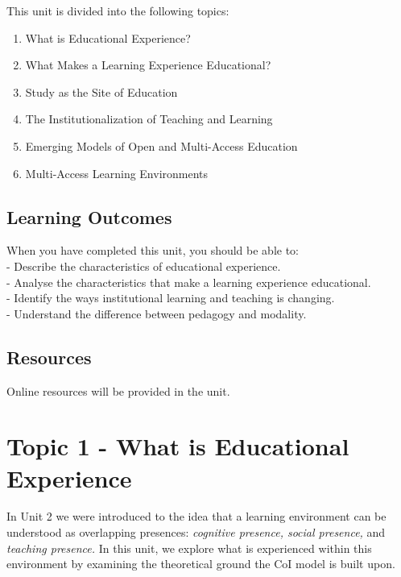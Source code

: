 \documentclass[
]{book}
\providecommand{\tightlist}{%
  \setlength{\itemsep}{0pt}\setlength{\parskip}{0pt}}
\begin{document}
This unit is divided into the following topics:

\begin{enumerate}
\def\labelenumi{\arabic{enumi}.}
\tightlist
\item
  What is Educational Experience?
\item
  What Makes a Learning Experience Educational?
\item
  Study as the Site of Education
\item
  The Institutionalization of Teaching and Learning
\item
  Emerging Models of Open and Multi-Access Education
\item
  Multi-Access Learning Environments
\end{enumerate}

\hypertarget{learning-outcomes-3}{%
\subsection*{Learning Outcomes}\label{learning-outcomes-3}}

When you have completed this unit, you should be able to:\\
- Describe the characteristics of educational experience.\\
- Analyse the characteristics that make a learning experience educational.\\
- Identify the ways institutional learning and teaching is changing.\\
- Understand the difference between pedagogy and modality.

\hypertarget{resources-5}{%
\subsection*{Resources}\label{resources-5}}

Online resources will be provided in the unit.

\hypertarget{topic-1---what-is-educational-experience}{%
\section*{Topic 1 - What is Educational Experience}\label{topic-1---what-is-educational-experience}}

In Unit 2 we were introduced to the idea that a learning environment can be understood as overlapping presences: \emph{cognitive presence, social presence,} and \emph{teaching presence.} In this unit, we explore what is experienced within this environment by examining the theoretical ground the CoI model is built upon.
\end{document}
